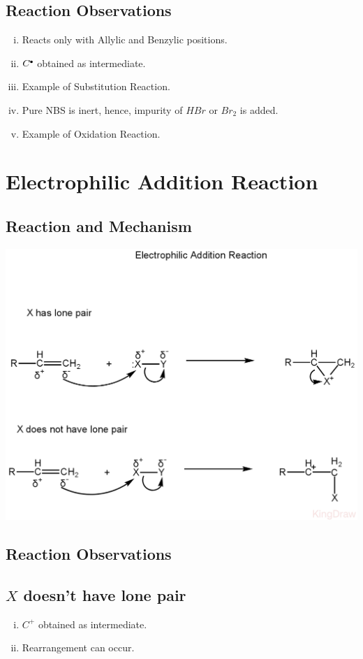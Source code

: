 \documentclass{article}
\newcommand*\fullcirc[1][0.3ex]{\tikz\fill (0,0) circle (#1);}
\begin{document}
\subsection{Reaction Observations}
\begin{enumerate}[i.]
    \item Reacts only with Allylic and Benzylic positions.
    \item $C^{\fullcirc}$ obtained as intermediate.
    \item Example of Substitution Reaction.
    \item Pure NBS is inert, hence, impurity of $HBr$ or $Br_{2}$ is added.
    \item Example of Oxidation Reaction.
\end{enumerate}

\section{Electrophilic Addition Reaction}
\subsection{Reaction and Mechanism}
\begin{center}
    \includegraphics[scale=0.3]{ElectrophilicAdditionReaction_1722210371705.JPEG}
\end{center}
\subsection{Reaction Observations}
\subsection{$X$ doesn't have lone pair}
\begin{enumerate}[i.]
    \item $C^+$ obtained as intermediate.
    \item Rearrangement can occur.
\end{enumerate}
\end{document}
